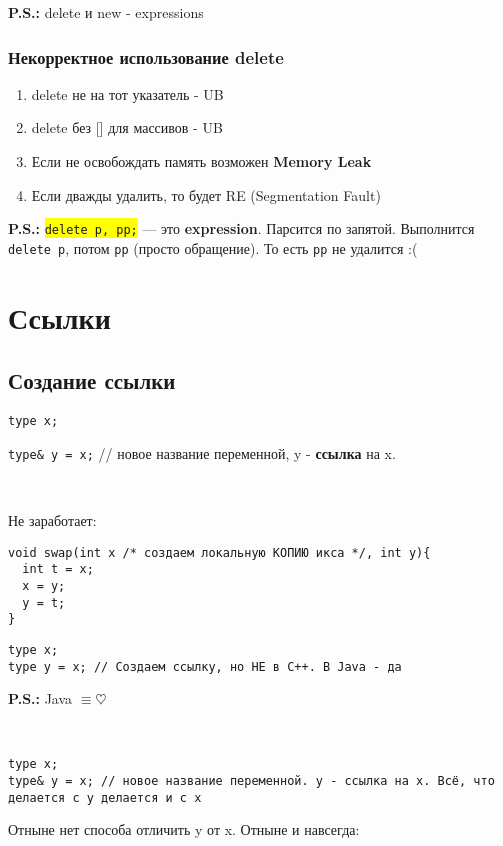 \documentclass[12pt]{article}
\newcommand{\ps}{\textbf{P.S.: }}
\begin{document}
\ps delete и new - expressions

\subsubsection{Некорректное использование delete}

\begin{enumerate}
	\item delete не на тот указатель - UB
	\item delete без [] для массивов - UB
	\item Если не освобождать память возможен \textbf{Memory Leak}
	\item Если дважды удалить, то будет RE (Segmentation Fault)
\end{enumerate}

\ps \colorbox{yellow}{\texttt{delete p, pp;}} --- это \textbf{expression}. Парсится по запятой. Выполнится \texttt{delete p}, потом \texttt{pp} (просто обращение). То есть \texttt{pp} не удалится :(

\section{Ссылки}

\subsection{Создание ссылки}

\texttt{type x;}

\texttt{type\& y = x;} // новое название переменной, y - \textbf{ссылка} на x.

\

Не заработает:
\begin{lstlisting}
void swap(int x /* создаем локальную КОПИЮ икса */, int y){
  int t = x;
  x = y;
  y = t;
} 
\end{lstlisting}

\begin{lstlisting}
type x;
type y = x; // Создаем ссылку, но НЕ в С++. В Java - да 
\end{lstlisting}
\ps Java $\equiv\heartsuit$

\

\begin{lstlisting}
type x;
type& y = x; // новое название переменной. y - ссылка на x. Всё, что делается с y делается и с x 
\end{lstlisting}

Отныне нет способа отличить y от x. Отныне и навсегда:
\end{document}
